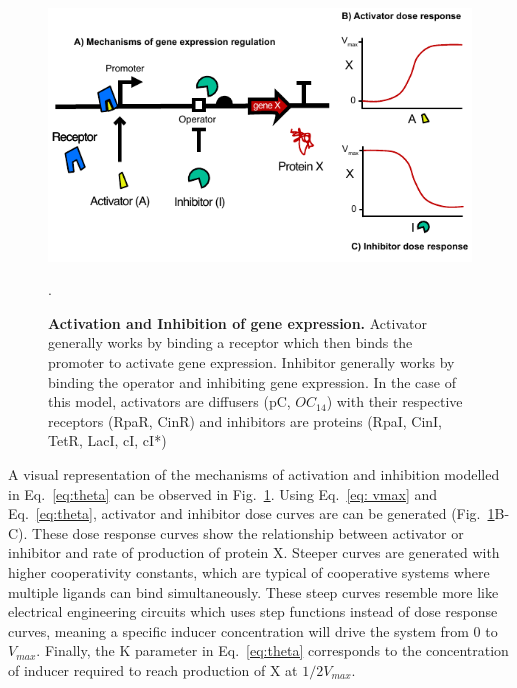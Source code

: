 \begin{figure}[H] %
    \centering
    \begin{adjustbox}{center}
        \includegraphics[width=1\textwidth]{chapters/Chapter 2/activation_inhibition2} %
    \end{adjustbox}
    \caption{\textbf{Activation and Inhibition of gene expression.} Activator generally works by binding a receptor which then binds the promoter to activate gene expression. Inhibitor generally works by binding the operator and inhibiting gene expression. In the case of this model, activators are diffusers (pC, $OC_{14}$) with their respective receptors (RpaR, CinR) and inhibitors are proteins (RpaI, CinI, TetR, LacI, cI, cI*) }. %
    \label{fig:activation_inhibition} %
\end{figure}

A visual representation of the mechanisms of activation and inhibition modelled in Eq.~\ref{eq:theta} can be observed in Fig.~\ref{fig:activation_inhibition}.
Using Eq.~\ref{eq: vmax} and Eq.~\ref{eq:theta}, activator and inhibitor dose curves are can be generated (Fig.~\ref{fig:activation_inhibition}B-C).
These dose response curves show the relationship between activator or inhibitor and rate of production of protein X.
Steeper curves are generated with higher cooperativity constants, which are typical of cooperative systems where multiple ligands can bind simultaneously.
These steep curves resemble more like electrical engineering circuits which uses step functions instead of dose response curves, meaning a specific inducer concentration will drive the system from 0 to $V_{max}$.
Finally, the K parameter in Eq.~\ref{eq:theta} corresponds to the concentration of inducer required to reach production of X at  $1/2 V_{max}$.



